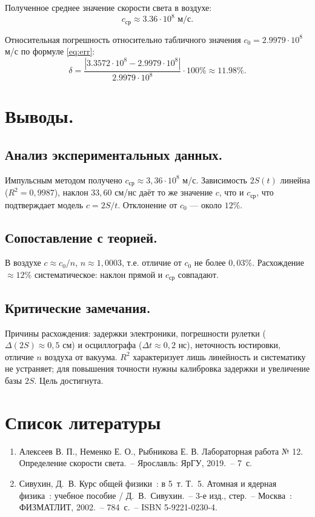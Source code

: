 \documentclass[12pt, a4paper]{article}
\begin{document}
	Полученное среднее значение скорости света в воздухе:
	\[
	c_{\text{ср}} \approx 3.36 \cdot 10^8 \text{ м/с}.
	\]
	
	Относительная погрешность относительно табличного значения $c_0 = 2.9979 \cdot 10^8$ м/с по формуле \eqref{eq:err}:
	\[
	\delta = \frac{|3.3572 \cdot 10^8 - 2.9979 \cdot 10^8|}{2.9979 \cdot 10^8} \cdot 100\% \approx 11.98\%.
	\]
	
	\section{Выводы.}
	\subsection*{Анализ экспериментальных данных.}
	Импульсным методом получено $c_{\text{ср}} \approx 3{,}36 \cdot 10^8$ м/с. Зависимость $2S(t)$ линейна ($R^2 = 0{,}9987$), наклон $33{,}60$ см/нс даёт то же значение $c$, что и $c_{\text{ср}}$, что подтверждает модель $c = 2S/t$. Отклонение от $c_0$ --- около $12\%$.
	
	\subsection*{Сопоставление с теорией.}
	В воздухе $c \approx c_0/n$, $n \approx 1{,}0003$, т.е. отличие от $c_0$ не более $0{,}03\%$. Расхождение $\approx 12\%$ систематическое: наклон прямой и $c_{\text{ср}}$ совпадают.
	
	\subsection*{Критические замечания.}
	Причины расхождения: задержки электроники, погрешности рулетки ($\Delta(2S) \approx 0{,}5$ см) и осциллографа ($\Delta t \approx 0{,}2$ нс), неточность юстировки, отличие $n$ воздуха от вакуума. $R^2$ характеризует лишь линейность и систематику не устраняет; для повышения точности нужны калибровка задержки и увеличение базы $2S$. Цель достигнута.
	
	\newpage
	\section*{Список литературы}
	
	\begin{enumerate}
		\item Алексеев В. П., Неменко Е. О., Рыбникова Е. В. Лабораторная работа № 12. Определение скорости света.~-- Ярославль: ЯрГУ, 2019.~-- 7~с.
		\item Сивухин, Д.~В. Курс общей физики~: в 5~т. Т.~5. Атомная и ядерная физика~: учебное пособие / Д.~В.~Сивухин.~-- 3-е изд., стер.~-- Москва~: ФИЗМАТЛИТ, 2002.~-- 784~с.~-- ISBN 5-9221-0230-4.
	\end{enumerate}
	
\end{document}
